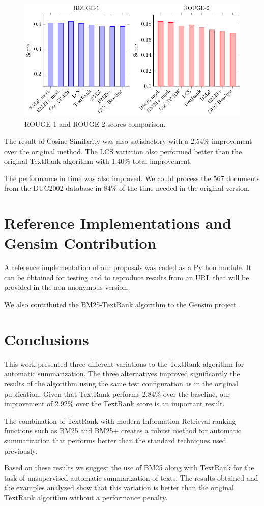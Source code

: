 \documentclass{llncs}
\begin{document}
\begin{figure}[h!]
    \centering
    \includegraphics[width=1\textwidth]{rouge-scores-en.pdf}
    \caption{ROUGE-1 and ROUGE-2 scores comparison.}
\end{figure}

The result of Cosine Similarity was also satisfactory with a 2.54\% improvement over the original method. The LCS variation also performed better than the original TextRank algorithm with 1.40\% total improvement.

The performance in time was also improved. We could process the 567 documents from the DUC2002 database in 84\% of the time needed in the original version.


\section{Reference Implementations and Gensim Contribution}
A reference implementation of our proposals was coded as a Python module. It can be obtained for testing and to reproduce results from an URL that will be provided in the non-anonymous version.

We also contributed the BM25-TextRank algorithm to the Gensim project \cite{rehurek_lrec}.

\section{Conclusions}
This work presented three different variations to the TextRank algorithm for automatic summarization. The three alternatives improved significantly the results of the algorithm using the same test configuration as in the original publication. Given that TextRank performs 2.84\% over the baseline, our improvement of 2.92\% over the TextRank score is an important result. 

The combination of TextRank with modern Information Retrieval ranking functions such as BM25 and BM25+ creates a robust method for automatic summarization that performs better than the standard techniques used previously. 

Based on these results we suggest the use of BM25 along with TextRank for the task of unsupervised automatic summarization of texts. The results obtained and the examples analyzed show that this variation is better than the original TextRank algorithm without a performance penalty.

{}

\end{document}
